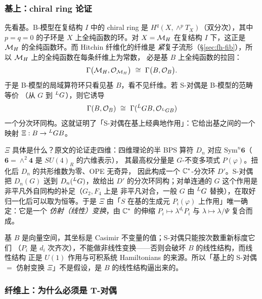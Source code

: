 \subsubsection*{基上：chiral ring 论证}

先看基。B-模型在复结构 $I$ 中的 chiral ring 是
$H^q(X,\wedge^pT_X)$（双分次），其中 $p=q=0$ 的子环是 $X$ 上全纯函数的环。对
$X=\mathcal{M}_H$ 在复结构 $I$ 下，这正是 $\mathcal{M}_H$ 的全纯函数环。而 Hitchin 纤维化的纤维是
\emph{紧}复子流形（§\ref{sec:fh-fib}），所以 $\mathcal{M}_H$ 上的全纯函数在每条纤维上为常数，
必是基 $B$ 上全纯函数的拉回：\pA{}
\begin{equation}
\Gamma\bigl(\mathcal{M}_H,\mathcal O_{\mathcal{M}_H}\bigr)\ \cong\ \Gamma\bigl(B,\mathcal O_B\bigr).
\label{eq:chiral-base}
\end{equation}
于是 B-模型的局域算符环只看见基 $B$，看不见纤维。若 S-对偶是 B-模型的范畴等价
（从 $G$ 到 ${}^{L}G$），则它诱导
\begin{equation}
\Gamma(B,\mathcal O_B)\ \cong\ \Gamma({}^{L}G B,\mathcal O_{{}^{L}G B})
\label{eq:ring-iso}
\end{equation}
一个分次环同构。这就证明了「S-对偶在基上经典地作用」：它给出基之间的一个映射
$\Xi:B\to{}^{L}G B$。\pB{}

$\Xi$ 具体是什么？原文的论证走四维：四维理论的半 BPS 算符 $D_n$ 对应
$\mathrm{Sym}^n\mathbf 6$（$\mathbf 6=\wedge^2\mathbf 4$ 是 $SU(4)_R$ 的六维表示），
其最高权分量是 $G$-不变多项式 $P(\varphi)$。扭化后 $D_n$ 的共形维数为零、OPE 无奇异，
因此构成一个 $\mathbb{C}^*$-分次环 $D'$。S-对偶把 $D_n(G)$ 送到 $D_n({}^{L}G)$，故给出
$D'$ 的分次环同构；对单连通的 $G$ 这个作用是非平凡外自同构的补足（$G_2,F_4$ 上是
非平凡对合，一般 $G$ 由 ${}^{L}G$ 替换），在取好归一化后可以取为恒等。于是
$\Xi$ 由「$S$ 在基的生成元 $P_i(\varphi)$ 上作用」唯一确定：它是一个
\emph{仿射（线性）变换}，由 $\mathbb{C}^*$ 的伸缩 $P_i\mapsto\lambda^{d_i}P_i$ 与
$\lambda\mapsto\lambda/\Psi$ 复合而成。\pB{}

基 $B$ 是向量空间，其坐标是 Casimir 不变量的值；S-对偶只能按次数重新标度它们
（$P_i$ 是 $d_i$ 次齐次），不能做非线性变换——否则会破坏 $B$ 的线性结构，而线性结构
正是 $U(1)$ 作用与可积系统 Hamiltonians 的来源。所以「基上的 S-对偶 $=$ 仿射变换
$\Xi$」不是假设，是 $B$ 的线性结构逼出来的。\pB{}

\subsubsection*{纤维上：为什么必须是 T-对偶}

